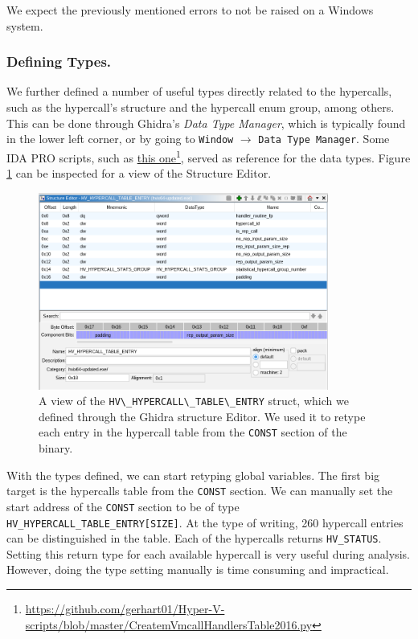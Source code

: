 \documentclass[runningheads]{llncs}
\newcommand{\cc}{\lstinline[mathescape]}
\begin{document}
We expect the previously mentioned errors to not be raised on a Windows system.

\vspace{-2mm}
\subsubsection{Defining Types.}

We further defined a number of useful types directly related to the hypercalls,
such as the hypercall's structure and the hypercall enum group, among others.
This can be done through Ghidra's \emph{Data Type Manager}, which is typically
found in the lower left corner, or by going to \cc{Window} $\to$
\cc{Data Type Manager}. Some IDA PRO scripts, such as
\href{https://github.com/gerhart01/Hyper-V-scripts/blob/master/CreatemVmcallHandlersTable2016.py}{this
one}\footnote{\url{https://github.com/gerhart01/Hyper-V-scripts/blob/master/CreatemVmcallHandlersTable2016.py}},
served as reference for the data types. Figure \ref{fig:struct_editor} can be
inspected for a view of the Structure Editor.

\begin{figure}[h]
    \centering
    \includegraphics[width=0.85\textwidth]{./assets/struct.png}
    \caption{A view of the \cc{HV\_HYPERCALL\_TABLE\_ENTRY} struct, which we
    defined through the Ghidra structure Editor. We used it to retype each
    entry in the hypercall table from the \cc{CONST} section of the binary.}
    \label{fig:struct_editor}
\end{figure}

With the types defined, we can start retyping global variables. The first big
target is the hypercalls table from the \cc{CONST} section. We can manually set
the start address of the \cc{CONST} section to be of type
\cc{HV_HYPERCALL_TABLE_ENTRY[SIZE]}. At the type of writing, 260 hypercall
entries can be distinguished in the table. Each of the hypercalls returns
\cc{HV_STATUS}. Setting this return type for each available hypercall is very
useful during analysis. However, doing the type setting manually is time
consuming and impractical.
\end{document}
